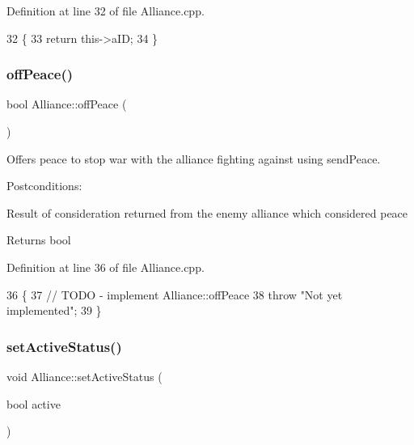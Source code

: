 Definition at line 32 of file Alliance.\+cpp.


\begin{DoxyCode}
32                     \{
33     \textcolor{keywordflow}{return} this->aID;
34 \}
\end{DoxyCode}
\mbox{\label{classAlliance_aa774a70192e6d4fd034cc7689b3ff5a8}} 
\subsubsection{\texorpdfstring{off\+Peace()}{offPeace()}}
{\footnotesize\ttfamily bool Alliance\+::off\+Peace (\begin{DoxyParamCaption}{ }\end{DoxyParamCaption})}



Offers peace to stop war with the alliance fighting against using send\+Peace. 

Postconditions\+:
\begin{DoxyItemize}
\item Result of consideration returned from the enemy alliance which considered peace
\end{DoxyItemize}

\begin{DoxyReturn}{Returns}
bool 
\end{DoxyReturn}


Definition at line 36 of file Alliance.\+cpp.


\begin{DoxyCode}
36                         \{
37     \textcolor{comment}{// TODO - implement Alliance::offPeace}
38     \textcolor{keywordflow}{throw} \textcolor{stringliteral}{"Not yet implemented"};
39 \}
\end{DoxyCode}
\mbox{\label{classAlliance_a21492fd899af1441c9d8ddf11a558e7d}} 
\subsubsection{\texorpdfstring{set\+Active\+Status()}{setActiveStatus()}}
{\footnotesize\ttfamily void Alliance\+::set\+Active\+Status (\begin{DoxyParamCaption}\item[{bool}]{active }\end{DoxyParamCaption})}



